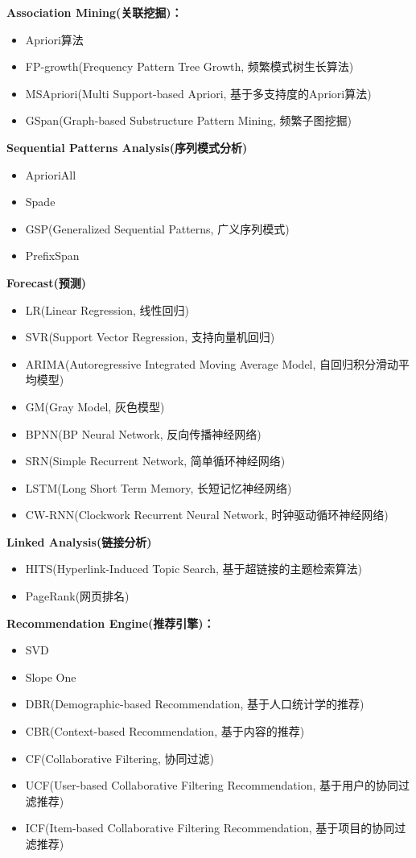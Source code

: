 \documentclass[10pt,a4paper]{ctexbook}
\begin{document}
\textbf{Association Mining(关联挖掘)：}
\begin{itemize}
\item Apriori算法
\item FP-growth(Frequency Pattern Tree Growth, 频繁模式树生长算法)
\item MSApriori(Multi Support-based Apriori, 基于多支持度的Apriori算法)
\item GSpan(Graph-based Substructure Pattern Mining, 频繁子图挖掘)
\end{itemize}

\textbf{Sequential Patterns Analysis(序列模式分析)}
\begin{itemize}
\item AprioriAll
\item Spade
\item GSP(Generalized Sequential Patterns, 广义序列模式)
\item PrefixSpan
\end{itemize}

\textbf{Forecast(预测)}
\begin{itemize}
\item LR(Linear Regression, 线性回归)
\item SVR(Support Vector Regression, 支持向量机回归)
\item ARIMA(Autoregressive Integrated Moving Average Model, 自回归积分滑动平均模型)
\item GM(Gray Model, 灰色模型)
\item BPNN(BP Neural Network, 反向传播神经网络)
\item SRN(Simple Recurrent Network, 简单循环神经网络)
\item LSTM(Long Short Term Memory, 长短记忆神经网络)
\item CW-RNN(Clockwork Recurrent Neural Network, 时钟驱动循环神经网络)
\end{itemize}

\textbf{Linked Analysis(链接分析)}
\begin{itemize}
\item HITS(Hyperlink-Induced Topic Search, 基于超链接的主题检索算法)
\item PageRank(网页排名)
\end{itemize}

\textbf{Recommendation Engine(推荐引擎)：}
\begin{itemize}
\item SVD
\item Slope One
\item DBR(Demographic-based Recommendation, 基于人口统计学的推荐)
\item CBR(Context-based Recommendation, 基于内容的推荐)
\item CF(Collaborative Filtering, 协同过滤)
\item UCF(User-based Collaborative Filtering Recommendation, 基于用户的协同过滤推荐)
\item ICF(Item-based Collaborative Filtering Recommendation, 基于项目的协同过滤推荐)
\end{itemize}
\end{document}
